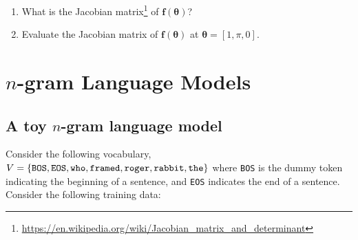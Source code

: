 \begin{enumerate}
    \item What is the Jacobian matrix\footnote{\url{https://en.wikipedia.org/wiki/Jacobian_matrix_and_determinant}} of $\mathbf{f}(\boldsymbol{\theta})$?\\
    
    \item Evaluate the Jacobian matrix of $\mathbf{f}(\boldsymbol{\theta})$ at 
    $\boldsymbol{\theta} = [1, \pi, 0]$.\\
    \solution{\[
        \begin{bmatrix}
            0 & 0 & 0 \\
            0 & 0 & 0 \\
            \pi & 0 & 0
        \end{bmatrix}^{\top}
    \]}
\end{enumerate}

\clearpage


\section{$n$-gram Language Models}
\subsection{A toy $n$-gram language model}

Consider the following vocabulary, $V= \{\tt BOS, EOS, who, framed, roger, rabbit, the\}$ where \texttt{BOS} is the dummy token indicating the beginning of a sentence, and \texttt{EOS} indicates the end of a sentence. Consider the following training data:

\noindent{}

